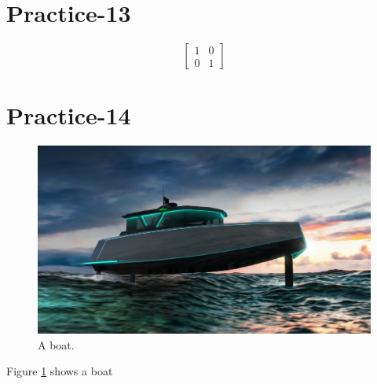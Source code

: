 \documentclass{article}
\begin{document}
\section{Practice-13}
	\begin{equation*}
	\left[
	\begin{matrix}
		1 & 0\\
		0 & 1
	\end{matrix}
	\right]
\end{equation*}
\section{Practice-14}
	\begin{figure}
	\includegraphics[width=\linewidth]{boat.jpg}
	\caption{A boat.}
	\label{fig:boat1}
\end{figure}
Figure \ref{fig:boat1} shows a boat 
\end{document}
